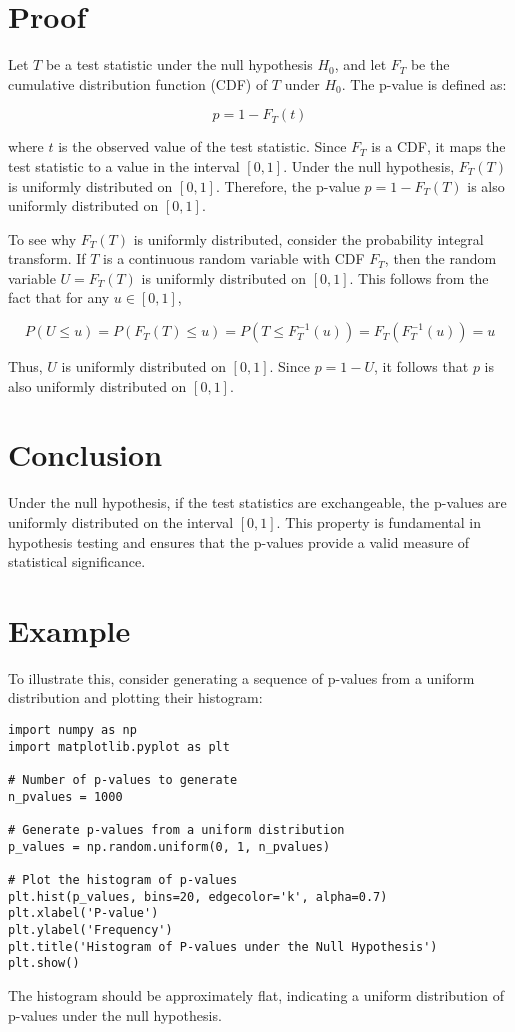 \documentclass{article}
\begin{document}
\section{Proof}

Let \(T\) be a test statistic under the null hypothesis \(H_0\), and let \(F_T\) be the cumulative distribution function (CDF) of \(T\) under \(H_0\). The p-value is defined as:

\[
p = 1 - F_T(t)
\]

where \(t\) is the observed value of the test statistic. Since \(F_T\) is a CDF, it maps the test statistic to a value in the interval \([0, 1]\). Under the null hypothesis, \(F_T(T)\) is uniformly distributed on \([0, 1]\). Therefore, the p-value \(p = 1 - F_T(T)\) is also uniformly distributed on \([0, 1]\).

To see why \(F_T(T)\) is uniformly distributed, consider the probability integral transform. If \(T\) is a continuous random variable with CDF \(F_T\), then the random variable \(U = F_T(T)\) is uniformly distributed on \([0, 1]\). This follows from the fact that for any \(u \in [0, 1]\),

\[
P(U \leq u) = P(F_T(T) \leq u) = P(T \leq F_T^{-1}(u)) = F_T(F_T^{-1}(u)) = u
\]

Thus, \(U\) is uniformly distributed on \([0, 1]\). Since \(p = 1 - U\), it follows that \(p\) is also uniformly distributed on \([0, 1]\).

\section{Conclusion}

Under the null hypothesis, if the test statistics are exchangeable, the p-values are uniformly distributed on the interval \([0, 1]\). This property is fundamental in hypothesis testing and ensures that the p-values provide a valid measure of statistical significance.

\section{Example}

To illustrate this, consider generating a sequence of p-values from a uniform distribution and plotting their histogram:

\begin{verbatim}
import numpy as np
import matplotlib.pyplot as plt

# Number of p-values to generate
n_pvalues = 1000

# Generate p-values from a uniform distribution
p_values = np.random.uniform(0, 1, n_pvalues)

# Plot the histogram of p-values
plt.hist(p_values, bins=20, edgecolor='k', alpha=0.7)
plt.xlabel('P-value')
plt.ylabel('Frequency')
plt.title('Histogram of P-values under the Null Hypothesis')
plt.show()
\end{verbatim}

The histogram should be approximately flat, indicating a uniform distribution of p-values under the null hypothesis.
\end{document}
